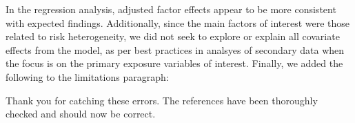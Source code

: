 \begin{response}
In the regression analysis, adjusted factor effects appear to be more consistent with expected findings.
Additionally, since the main factors of interest were those related to risk heterogeneity,
we did not seek to explore or explain all covariate effects from the model, as per best practices in analsyes of secondary data when the focus is on the primary exposure variables of interest. %
Finally, we added the following to the limitations paragraph:
\end{response}
\begin{comment}
The references in the supplementary materials are incorrectly formatted. Often they give the second initial of the author but not the first initial. For example, L. Korenromp (reference 62) should be E.L. Korenromp, and J. Abu-Raddad (reference 56) should be L.J. Abu-Raddad.
\end{comment}
\begin{response}
Thank you for catching these errors.
The references have been thoroughly checked and should now be correct.
\end{response}